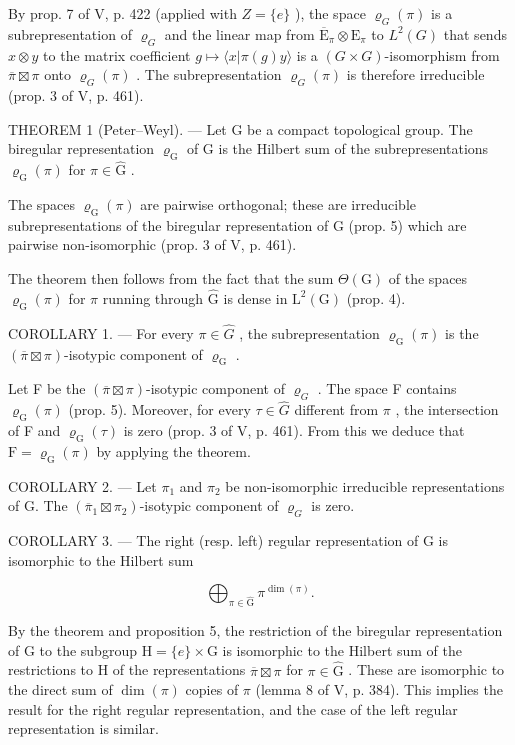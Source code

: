 By prop. 7 of V, p. 422 (applied with \(Z = \{e\}\) ), the space \(\varrho_{G}(\pi)\) is a subrepresentation of \(\varrho_{G}\) and the linear map from \(\overline{\mathrm{E}}_{\pi} \otimes \mathrm{E}_{\pi}\) to \(L^2(G)\) that sends \(x \otimes y\) to the matrix coefficient \(g \mapsto \langle x | \pi(g)y \rangle\) is a \((G \times G)\)-isomorphism from \(\overline{\pi} \boxtimes \pi\) onto \(\varrho_{G}(\pi)\) . The subrepresentation \(\varrho_{G}(\pi)\) is therefore irreducible (prop. 3 of V, p. 461).

THEOREM 1 (Peter--Weyl). --- Let G be a compact topological group. The biregular representation \(\varrho_{\mathrm{G}}\) of G is the Hilbert sum of the subrepresentations \(\varrho_{\mathrm{G}}(\pi)\) for \(\pi \in \widehat{\mathrm{G}}\) .

The spaces \(\varrho_{\mathrm{G}}(\pi)\) are pairwise orthogonal; these are irreducible subrepresentations of the biregular representation of G (prop. 5) which are pairwise non-isomorphic (prop. 3 of V, p. 461).

The theorem then follows from the fact that the sum \(\Theta(\mathrm{G})\) of the spaces \(\varrho_{\mathrm{G}}(\pi)\) for \(\pi\) running through \(\widehat{\mathrm{G}}\) is dense in \(\mathrm{L}^2(\mathrm{G})\) (prop. 4).

COROLLARY 1. --- For every \(\pi\in\widehat{G}\) , the subrepresentation \(\varrho_{\mathrm{G}}(\pi)\) is the \((\overline{\pi}\boxtimes\pi)\)-isotypic component of \(\varrho_{\mathrm{G}}\) .

Let F be the \((\overline{\pi} \boxtimes \pi)\)-isotypic component of \(\varrho_{G}\) . The space F contains \(\varrho_{\mathrm{G}}(\pi)\) (prop. 5). Moreover, for every \(\tau \in \widehat{G}\) different from \(\pi\) , the intersection of F and \(\varrho_{\mathrm{G}}(\tau)\) is zero (prop. 3 of V, p. 461). From this we deduce that \(\mathrm{F} = \varrho_{\mathrm{G}}(\pi)\) by applying the theorem.

COROLLARY 2. --- Let \(\pi_1\) and \(\pi_2\) be non-isomorphic irreducible representations of G. The \((\overline{\pi}_1 \boxtimes \pi_2)\)-isotypic component of \(\varrho_G\) is zero.

COROLLARY 3. --- The right (resp. left) regular representation of G is isomorphic to the Hilbert sum

\[
\bigoplus_ {\pi \in \widehat {\mathrm{G}}} \pi^ {\dim (\pi)}.
\]

By the theorem and proposition 5, the restriction of the biregular representation of G to the subgroup \(\mathrm{H} = \{e\} \times \mathrm{G}\) is isomorphic to the Hilbert sum of the restrictions to H of the representations \(\overline{\pi} \boxtimes \pi\) for \(\pi \in \widehat{\mathrm{G}}\) . These are isomorphic to the direct sum of \(\dim(\pi)\) copies of \(\pi\) (lemma 8 of V, p. 384). This implies the result for the right regular representation, and the case of the left regular representation is similar.

